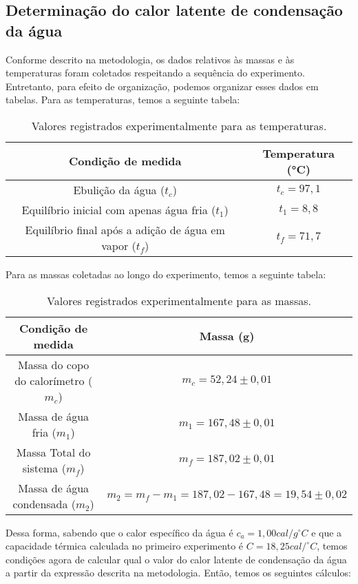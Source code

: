 \subsection{Determinação do calor latente de condensação da água}

Conforme descrito na metodologia, os dados relativos às massas e às temperaturas foram coletados respeitando a sequência do experimento. Entretanto, para efeito de organização, podemos organizar esses dados em tabelas. Para as temperaturas, temos a seguinte tabela:

\begin{table}[H]
    \centering
    \begin{tabular}{ |c||c| }
        \hline
        \textbf{Condição de medida} & \textbf{Temperatura (°C)}\\
        \hline 
        Ebulição da água ($t_c$)  & $t_c = 97,1$ \\
        Equilíbrio inicial com apenas água fria ($t_1$) & $t_1 = 8,8$  \\  
        Equilíbrio final após a adição de água em vapor ($t_f$) & $t_f = 71,7$  \\
        \hline
        \end{tabular}
    \caption{Valores registrados experimentalmente para as temperaturas.} 
\end{table}

Para as massas coletadas ao longo do experimento, temos a seguinte tabela:

\begin{table}[H]
    \centering
    \begin{tabular}{ |c||c| }
        \hline
        \textbf{Condição de medida} & \textbf{Massa (g)}\\
        \hline 
        Massa do copo do calorímetro  ($m_c$)  & $m_c = 52,24 \pm 0,01$ \\
        Massa de água fria  ($m_1$) & $m_1 = 167,48 \pm 0,01$  \\  
        Massa Total do sistema ($m_f$) & $m_f = 187,02 \pm 0,01$  \\
        Massa de água condensada  ($m_2$) & $m_2 = m_f - m_1 = 187,02 - 167,48 = 19,54 \pm 0,02$  \\
        \hline
        \end{tabular}
    \caption{Valores registrados experimentalmente para as massas.} 
\end{table}

Dessa forma, sabendo que o calor específico da água é $c_a= 1,00 cal/g^\circ C$ e que a capacidade térmica calculada no primeiro experimento é $C = 18,25 cal/^\circ C$, temos condições agora de calcular qual o valor do calor latente de condensação da água a partir da expressão descrita na metodologia. Então, temos os seguintes cálculos:

